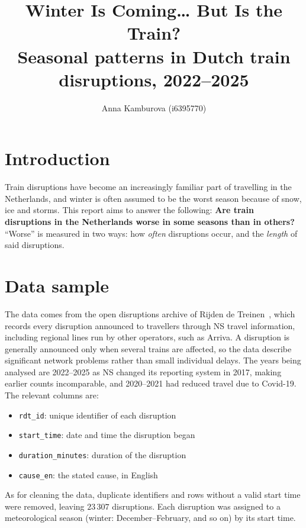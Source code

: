\documentclass[10pt,a4paper]{article}
\title{\textbf{Winter Is Coming\ldots{} But Is the Train?}\\[2pt]
\large Seasonal patterns in Dutch train disruptions, 2022--2025}
\author{Anna Kamburova (i6395770)}
\begin{document}
\maketitle
\vspace{-1em}

\section*{Introduction}
Train disruptions have become an increasingly familiar part of travelling in the Netherlands, and winter is often assumed to be the worst season because of snow, ice and storms. This report aims to answer the following:
\textbf{Are train disruptions in the Netherlands worse in some seasons than in others?}
``Worse'' is measured in two ways: how \emph{often} disruptions occur, and the \emph{length} of said disruptions.

\section*{Data sample}
The data comes from the open disruptions archive of Rijden de Treinen~\cite{rdt}, which records every disruption announced to travellers through NS travel information, including regional lines run by other operators, such as Arriva. A disruption is generally announced only when several trains are affected, so the data describe significant network problems rather than small individual delays. The years being analysed are 2022--2025 as NS changed its reporting system in 2017, making earlier counts incomparable, and 2020--2021 had reduced travel due to Covid-19. The relevant columns are:
\begin{itemize}\setlength\itemsep{0pt}
  \item \texttt{rdt\_id}: unique identifier of each disruption
  \item \texttt{start\_time}: date and time the disruption began
  \item \texttt{duration\_minutes}: duration of the disruption
  \item \texttt{cause\_en}: the stated cause, in English
\end{itemize}
As for cleaning the data, duplicate identifiers and rows without a valid start time were removed, leaving $23\,307$ disruptions. Each disruption was assigned to a meteorological season (winter: December--February, and so on) by its start time.
\end{document}
